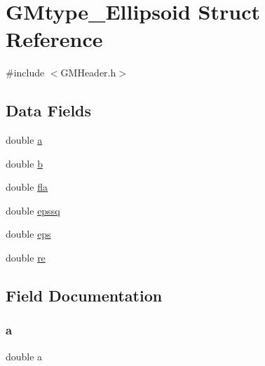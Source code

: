 \hypertarget{struct_g_mtype___ellipsoid}{}\section{G\+Mtype\+\_\+\+Ellipsoid Struct Reference}
\label{struct_g_mtype___ellipsoid}


{\ttfamily \#include $<$G\+M\+Header.\+h$>$}

\subsection*{Data Fields}
\begin{DoxyCompactItemize}
\item 
double \mbox{\hyperlink{struct_g_mtype___ellipsoid_a1031d0e0a97a340abfe0a6ab9e831045}{a}}
\item 
double \mbox{\hyperlink{struct_g_mtype___ellipsoid_a1510a66dacf9cf3586de5fc89ae2a073}{b}}
\item 
double \mbox{\hyperlink{struct_g_mtype___ellipsoid_a50306210781b3f4f0ec6d005823310d5}{fla}}
\item 
double \mbox{\hyperlink{struct_g_mtype___ellipsoid_ae609c1cf175e3601d59f31dd63ecfe3f}{epssq}}
\item 
double \mbox{\hyperlink{struct_g_mtype___ellipsoid_a974b448c3d0a13d483d36ef15de369b5}{eps}}
\item 
double \mbox{\hyperlink{struct_g_mtype___ellipsoid_a5a6fce2fc5cae153945fea2c45beeb4f}{re}}
\end{DoxyCompactItemize}


\subsection{Field Documentation}
\mbox{\label{struct_g_mtype___ellipsoid_a1031d0e0a97a340abfe0a6ab9e831045}} 
\subsubsection{\texorpdfstring{a}{a}}
{\footnotesize\ttfamily double a}

\mbox{\label{struct_g_mtype___ellipsoid_a1510a66dacf9cf3586de5fc89ae2a073}} 

